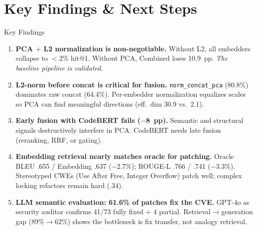 \documentclass[aspectratio=169,10pt]{beamer}
\begin{document}
\section{Key Findings \& Next Steps}

\begin{frame}{Key Findings}

  \begin{enumerate}\setlength{\itemsep}{0.5em}

    \item[\textcolor{hit}{\faIcon{check-circle}}]
      \textbf{PCA $+$ L2 normalization is non-negotiable.}
      Without L2, all embedders collapse to $<$2\% hit@1.
      Without PCA, Combined loses 10.9~pp.
      \textit{The baseline pipeline is validated.}

    \vspace{0.3em}
    \item[\textcolor{c1}{\faIcon{chart-bar}}]
      \textbf{L2-norm before concat is critical for fusion.}
      \texttt{norm\_concat\_pca} (80.8\%) dominates raw concat (64.4\%).
      Per-embedder normalization equalizes scales so PCA can find
      meaningful directions (eff.\ dim 30.9 vs.\ 2.1).

    \vspace{0.3em}
    \item[\textcolor{miss}{\faIcon{times-circle}}]
      \textbf{Early fusion with CodeBERT fails ($-$8~pp).}
      Semantic and structural signals destructively interfere in PCA.
      CodeBERT needs late fusion (reranking, RRF, or gating).

    \vspace{0.3em}
    \item[\textcolor{c3}{\faIcon{robot}}]
      \textbf{Embedding retrieval nearly matches oracle for patching.}
      Oracle BLEU .655 / Embedding .637 ($-$2.7\%); ROUGE-L .766 / .741 ($-$3.3\%).
      Stereotyped CWEs (Use After Free, Integer Overflow) patch well;
      complex locking refactors remain hard (.34).

    \vspace{0.3em}
    \item[\textcolor{c4}{\faIcon{shield-alt}}]
      \textbf{LLM semantic evaluation: 61.6\% of patches fix the CVE.}
      GPT-4o as security auditor confirms 41/73 fully fixed $+$ 4 partial.
      Retrieval$\to$generation gap (89\%$\to$62\%) shows
      the bottleneck is fix transfer, not analogy retrieval.

  \end{enumerate}
\end{frame}
\end{document}
